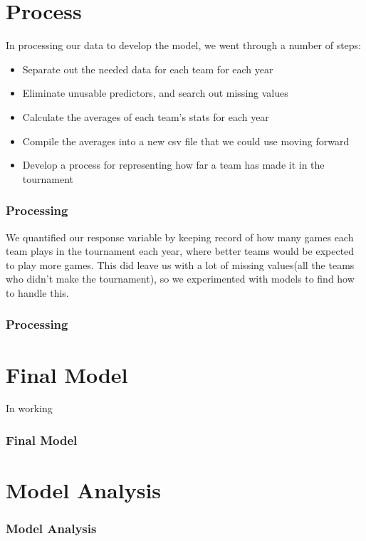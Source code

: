 \documentclass[11pt]{beamer}
\begin{document}
\section{Process}
\begin{frame}
In processing our data to develop the model, we went through a number of steps:
\begin{itemize}
	\footnotesize
	\item Separate out the needed data for each team for each year
	\item Eliminate unusable predictors, and search out missing values
	\item Calculate the averages of each team's stats for each year
	\item Compile the averages into a new csv file that we could use moving forward
	\item Develop a process for representing how far a team has made it in the tournament
\end{itemize}
\frametitle{{\textbf{\huge Processing}}}
\end{frame}
\begin{frame}
\center We quantified our response variable by keeping record of how many games each team plays in the tournament each year, where better teams would be expected to play more games. This did leave us with a lot of missing values(all the teams who didn't make the tournament), so we experimented with models to find how to handle this.
\frametitle{{\textbf{\huge Processing}}}
\end{frame}
\section{Final Model}
\begin{frame}
In working 
\frametitle{{\textbf{\huge Final Model}}}
\end{frame}
\section{Model Analysis}
\begin{frame}
\frametitle{{\textbf{\huge Model Analysis}}}
\end{frame}
\end{document}
